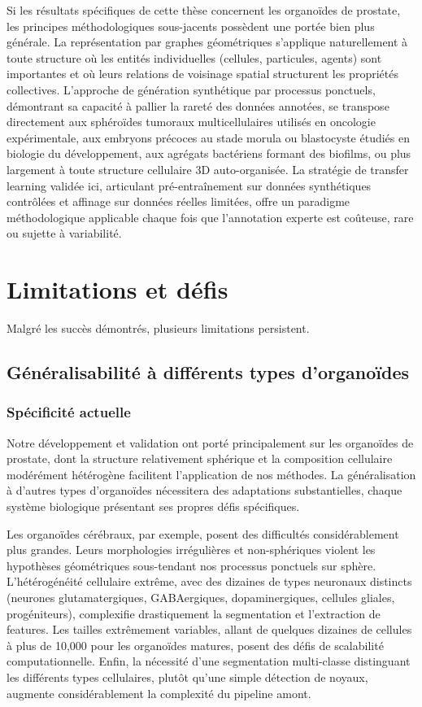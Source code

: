 Si les résultats spécifiques de cette thèse concernent les organoïdes de prostate, les principes méthodologiques sous-jacents possèdent une portée bien plus générale. La représentation par graphes géométriques s'applique naturellement à toute structure où les entités individuelles (cellules, particules, agents) sont importantes et où leurs relations de voisinage spatial structurent les propriétés collectives. L'approche de génération synthétique par processus ponctuels, démontrant sa capacité à pallier la rareté des données annotées, se transpose directement aux sphéroïdes tumoraux multicellulaires utilisés en oncologie expérimentale, aux embryons précoces au stade morula ou blastocyste étudiés en biologie du développement, aux agrégats bactériens formant des biofilms, ou plus largement à toute structure cellulaire 3D auto-organisée. La stratégie de transfer learning validée ici, articulant pré-entraînement sur données synthétiques contrôlées et affinage sur données réelles limitées, offre un paradigme méthodologique applicable chaque fois que l'annotation experte est coûteuse, rare ou sujette à variabilité.

\section{Limitations et défis}

Malgré les succès démontrés, plusieurs limitations persistent.

\subsection{Généralisabilité à différents types d'organoïdes}

\subsubsection{Spécificité actuelle}

Notre développement et validation ont porté principalement sur les organoïdes de prostate, dont la structure relativement sphérique et la composition cellulaire modérément hétérogène facilitent l'application de nos méthodes. La généralisation à d'autres types d'organoïdes nécessitera des adaptations substantielles, chaque système biologique présentant ses propres défis spécifiques.

Les organoïdes cérébraux, par exemple, posent des difficultés considérablement plus grandes. Leurs morphologies irrégulières et non-sphériques violent les hypothèses géométriques sous-tendant nos processus ponctuels sur sphère. L'hétérogénéité cellulaire extrême, avec des dizaines de types neuronaux distincts (neurones glutamatergiques, GABAergiques, dopaminergiques, cellules gliales, progéniteurs), complexifie drastiquement la segmentation et l'extraction de features. Les tailles extrêmement variables, allant de quelques dizaines de cellules à plus de 10,000 pour les organoïdes matures, posent des défis de scalabilité computationnelle. Enfin, la nécessité d'une segmentation multi-classe distinguant les différents types cellulaires, plutôt qu'une simple détection de noyaux, augmente considérablement la complexité du pipeline amont.

